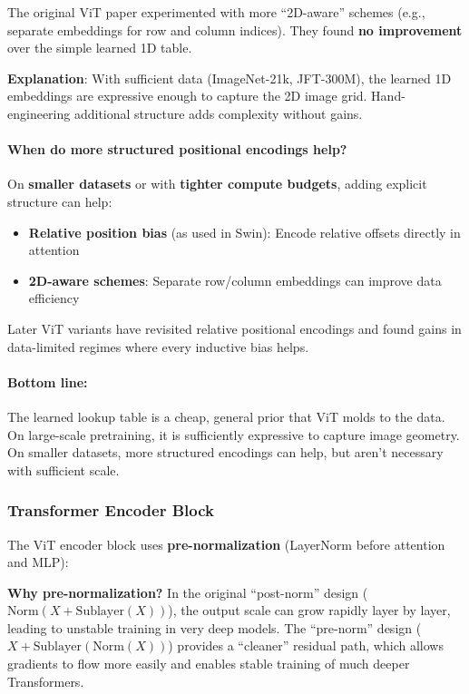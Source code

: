 \documentclass{article}
\begin{document}
\begin{tcolorbox}[colback=blue!5!white, colframe=blue!50!black, title=Are We Wasting Learning on Already-Known Spatial Proximity?]
The original ViT paper experimented with more ``2D-aware'' schemes (e.g., separate embeddings for row and column indices). They found \textbf{no improvement} over the simple learned 1D table.

\textbf{Explanation}: With sufficient data (ImageNet-21k, JFT-300M), the learned 1D embeddings are expressive enough to capture the 2D image grid. Hand-engineering additional structure adds complexity without gains.

\paragraph{When do more structured positional encodings help?}

On \textbf{smaller datasets} or with \textbf{tighter compute budgets}, adding explicit structure can help:
\begin{itemize}
\item \textbf{Relative position bias} (as used in Swin): Encode relative offsets directly in attention
\item \textbf{2D-aware schemes}: Separate row/column embeddings can improve data efficiency
\end{itemize}

Later ViT variants have revisited relative positional encodings and found gains in data-limited regimes where every inductive bias helps.

\paragraph{Bottom line:} The learned lookup table is a cheap, general prior that ViT molds to the data. On large-scale pretraining, it is sufficiently expressive to capture image geometry. On smaller datasets, more structured encodings can help, but aren't necessary with sufficient scale.
\end{tcolorbox}

\subsubsection{Transformer Encoder Block}

The ViT encoder block uses \textbf{pre-normalization} (LayerNorm before attention and MLP):


\textbf{Why pre-normalization?} In the original ``post-norm'' design ($\text{Norm}(X + \text{Sublayer}(X))$), the output scale can grow rapidly layer by layer, leading to unstable training in very deep models. The ``pre-norm'' design ($X + \text{Sublayer}(\text{Norm}(X))$) provides a ``cleaner'' residual path, which allows gradients to flow more easily and enables stable training of much deeper Transformers.
\end{document}

